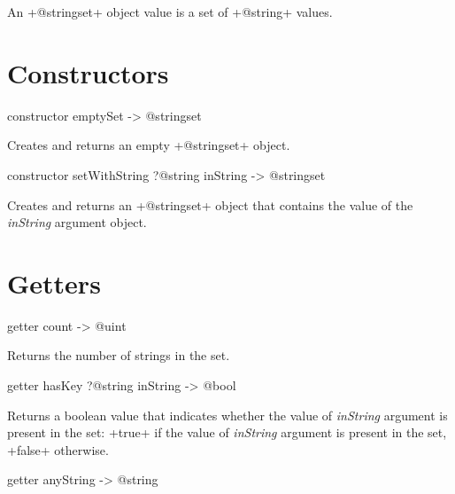 

An \ggs+@stringset+ object value is a set of \ggs+@string+ values.\\

\section{Constructors}


\begin{galgascode}
constructor emptySet -> @stringset
\end{galgascode}


Creates and returns an empty \ggs+@stringset+ object.


\begin{galgascode}
constructor setWithString ?@string inString -> @stringset
\end{galgascode}


Creates and returns an \ggs+@stringset+ object that contains the value of the \emph{inString} argument object.

\section{Getters}


\begin{galgascode}
getter count -> @uint
\end{galgascode}

Returns the number of strings in the set.




\begin{galgascode}
getter hasKey ?@string inString -> @bool
\end{galgascode}

Returns a boolean value that indicates whether the value of \emph{inString} argument is present in the set: \ggs+true+ if the value of \emph{inString} argument is present in the set, \ggs+false+ otherwise.



\begin{galgascode}
getter anyString -> @string
\end{galgascode}

